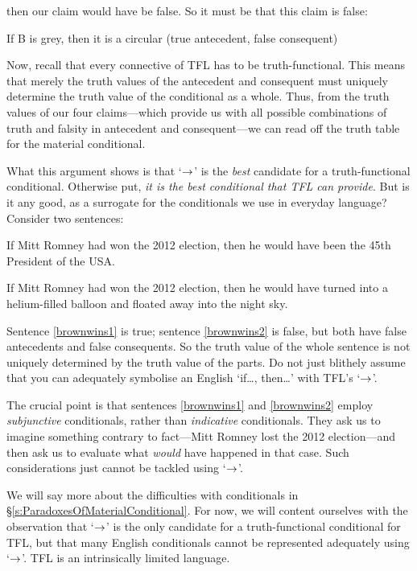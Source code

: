then our claim would have be false. So it must be that this claim is false:
	\begin{ebullet}
		\item If B is grey, then it is a circular \hfill (true antecedent, false consequent)
	\end{ebullet}
Now, recall that every connective of TFL has to be truth-functional. This means that merely the truth values of the antecedent and consequent must uniquely determine the truth value of the conditional as a whole. Thus, from the truth values of our four claims---which provide us with all possible combinations of truth and falsity in antecedent and consequent---we can read off the truth table for the material conditional.

What this argument shows is that `$\rightarrow$' is the \emph{best} candidate for a truth-functional conditional. Otherwise put, \emph{it is the best conditional that TFL can provide}. But is it any good, as a surrogate for the conditionals we use in everyday language? Consider two sentences:
	\begin{earg}
		\item[\ex{brownwins1}] If Mitt Romney had won the 2012 election, then he would have been the 45th President of the USA.
		\item[\ex{brownwins2}] If Mitt Romney had won the 2012 election, then he would have turned into a helium-filled balloon and floated away into the night sky.
	\end{earg}
Sentence \ref{brownwins1} is true; sentence \ref{brownwins2} is false, but both have false antecedents and false consequents. So the truth value of the whole sentence is not uniquely determined by the truth value of the parts. Do not just blithely assume that you can adequately symbolise an English `if\ldots, then\ldots' with TFL's `$\rightarrow$'. 

The crucial point is that sentences \ref{brownwins1} and \ref{brownwins2} employ \emph{subjunctive} conditionals, rather than \emph{indicative} conditionals. They ask us to imagine something contrary to fact---Mitt Romney lost the 2012 election---and then ask us to evaluate what \emph{would} have happened in that case. Such considerations just cannot be tackled using `$\rightarrow$'.

We will say more about the difficulties with conditionals in \S\ref{s:ParadoxesOfMaterialConditional}. For now, we will content ourselves with the observation that `$\rightarrow$' is the only candidate for a truth-functional conditional for TFL, but that many English conditionals cannot be represented adequately using `$\rightarrow$'. TFL is an intrinsically limited language. 


